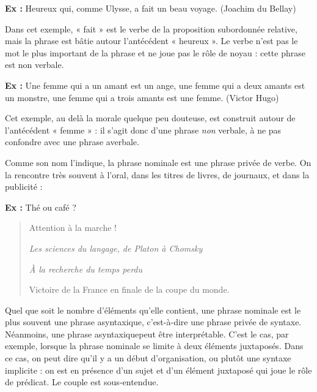 \noindent\textbf{Ex :} Heureux qui, comme Ulysse, a fait un beau voyage. (Joachim du Bellay)

Dans cet exemple, « fait » est le verbe de la proposition subordonnée relative, mais la phrase est bâtie autour l’antécédent « heureux ». Le verbe n’est pas le mot le plus important de la phrase et ne joue pas le rôle de noyau : cette phrase est non verbale.

\noindent\textbf{Ex :} Une femme qui a un amant est un ange, une femme qui a deux amants est un monstre, une femme qui a trois amants est une femme. (Victor Hugo)

Cet exemple, au delà la morale quelque peu douteuse, est construit autour de l’antécédent « femme » : il s’agit donc d’une phrase \textit{non} verbale, à ne pas confondre avec une phrase averbale.

Comme son nom l’indique, la phrase nominale est une phrase privée de verbe. On la rencontre très souvent à l’oral, dans les titres de livres, de journaux, et dans la publicité :

\noindent\textbf{Ex :} Thé ou café ?
\begin{quote}
Attention à la marche !

\textit{Les sciences du langage, de Platon à Chomsky}

\textit{À la recherche du temps perdu}

Victoire de la France en finale de la coupe du monde.
\end{quote}
Quel que soit le nombre d’éléments qu’elle contient, une phrase nominale est le plus souvent une phrase asyntaxique, c’est-à-dire une phrase privée de syntaxe. Néanmoins, une phrase asyntaxiquepeut être interprétable. C’est le cas, par exemple, lorsque la phrase nominale se limite à deux éléments juxtaposés. Dans ce cas, on peut dire qu’il y a un début d’organisation, ou plutôt une syntaxe implicite : on est en présence d’un sujet et d’un élément juxtaposé qui joue le rôle de prédicat. Le couple est sous-entendue.

